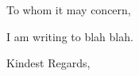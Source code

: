 
\signature{David Andrews}
\address{240 Center St, Laguna Beach, CA 92651 \\
david.andrews112@gmail.com \ \ \ \ (949) 633-0588}



\begin{letter}{}
\opening{To whom it may concern,}

I am writing to blah blah.

\closing{Kindest Regards,}
\end{letter}
 



